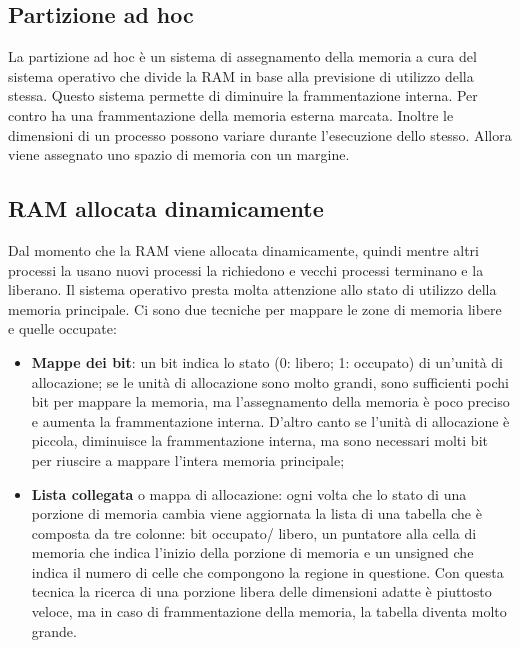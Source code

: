 \documentclass{article}
\begin{document}
\subsection{Partizione ad hoc}
La partizione ad hoc è un sistema di assegnamento della memoria a cura del sistema operativo che divide la RAM in base alla previsione di utilizzo della stessa. Questo sistema permette di diminuire la frammentazione interna. Per contro ha una frammentazione della memoria esterna marcata. Inoltre le dimensioni di un processo possono variare durante l'esecuzione dello stesso. Allora viene assegnato uno spazio di memoria con un  margine.

\subsection{RAM allocata dinamicamente}
Dal momento che la RAM viene allocata dinamicamente, quindi mentre altri processi la usano nuovi processi la richiedono e vecchi processi terminano e la liberano. Il sistema operativo presta molta attenzione allo stato di utilizzo della memoria principale. Ci sono due tecniche per mappare le zone di memoria libere e quelle occupate:
\begin{itemize}
	\item \textbf{Mappe dei bit}: un bit indica lo stato (0: libero; 1: occupato) di un'unità di allocazione; se le unità di allocazione sono molto grandi, sono sufficienti pochi bit per mappare la memoria, ma l'assegnamento della memoria è poco preciso e aumenta la frammentazione interna. D'altro canto se l'unità di allocazione è piccola, diminuisce la frammentazione interna, ma sono necessari molti bit per riuscire a mappare l'intera memoria principale;

	\item \textbf{Lista collegata} o mappa di allocazione: ogni volta che lo stato di una porzione di memoria cambia viene aggiornata la lista di una tabella che è composta da tre colonne: bit occupato/ libero, un puntatore alla cella di memoria che indica l'inizio della porzione di memoria e un unsigned che indica il numero di celle che compongono la regione in questione. Con questa tecnica la ricerca di una porzione libera delle dimensioni adatte è piuttosto veloce, ma in caso di frammentazione della memoria, la tabella diventa molto grande.
\end{itemize}
\end{document}
